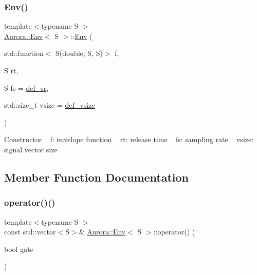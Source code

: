 \subsubsection{\texorpdfstring{Env()}{Env()}}
{\footnotesize\ttfamily template$<$typename S $>$ \\
\hyperlink{class_aurora_1_1_env}{Aurora\+::\+Env}$<$ S $>$\+::\hyperlink{class_aurora_1_1_env}{Env} (\begin{DoxyParamCaption}\item[{std\+::function$<$ S(double, S, S)$>$}]{f,  }\item[{S}]{rt,  }\item[{S}]{fs = {\ttfamily \hyperlink{namespace_aurora_ad49263d809bea98dd422e95bc91bc03e}{def\+\_\+sr}},  }\item[{std\+::size\+\_\+t}]{vsize = {\ttfamily \hyperlink{namespace_aurora_afaaddf667a06e7ce23c667a8b7295263}{def\+\_\+vsize}} }\end{DoxyParamCaption})\hspace{0.3cm}{\ttfamily [inline]}}

Constructor ~\newline
f\+: envelope function ~\newline
rt\+: release time ~\newline
fs\+: sampling rate ~\newline
vsize\+: signal vector size 

\subsection{Member Function Documentation}
\mbox{\label{class_aurora_1_1_env_a44666f7414faf21c568d20655d5e2761}} 
\subsubsection{\texorpdfstring{operator()()}{operator()()}\hspace{0.1cm}{\footnotesize\ttfamily [1/3]}}
{\footnotesize\ttfamily template$<$typename S $>$ \\
const std\+::vector$<$S$>$\& \hyperlink{class_aurora_1_1_env}{Aurora\+::\+Env}$<$ S $>$\+::operator() (\begin{DoxyParamCaption}\item[{bool}]{gate }\end{DoxyParamCaption})\hspace{0.3cm}{\ttfamily [inline]}}

